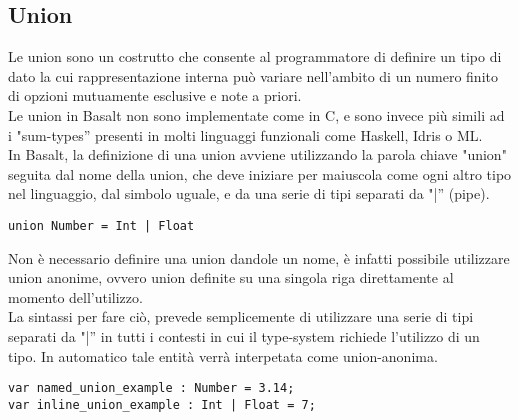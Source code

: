 \subsection{Union}
Le union sono un costrutto che consente al programmatore di definire un tipo di dato la cui rappresentazione 
interna può variare nell’ambito di un numero finito di opzioni mutuamente esclusive e note a priori. \\ 

Le union in Basalt non sono implementate come in C, e sono invece più simili ad i "sum-types” presenti in molti 
linguaggi funzionali come Haskell, Idris o ML. \\

In Basalt, la definizione di una union avviene utilizzando la parola chiave "union" seguita dal nome della union, 
che deve iniziare per maiuscola come ogni altro tipo nel linguaggio, dal simbolo uguale, 
e da una serie di tipi separati da "|” (pipe). \\

\vspace{0.5cm}
\begin{lstlisting}[frame=single]
union Number = Int | Float
\end{lstlisting}
\vspace{0.5cm}

Non è necessario definire una union dandole un nome, è infatti possibile utilizzare union anonime, 
ovvero union definite su una singola riga direttamente al momento dell’utilizzo. \\

La sintassi per fare ciò, prevede semplicemente di utilizzare  una serie di tipi separati da "|”
in tutti i contesti in cui il type-system richiede l’utilizzo di un tipo. In automatico 
tale entità verrà interpetata come union-anonima. \\

\vspace{0.5cm}
\begin{lstlisting}[frame=single]
var named_union_example : Number = 3.14;     
var inline_union_example : Int | Float = 7;
\end{lstlisting}
\vspace{0.5cm}

 
\newpage

 

 
\newpage

 \newpage


 
\newpage

 
\newpage
